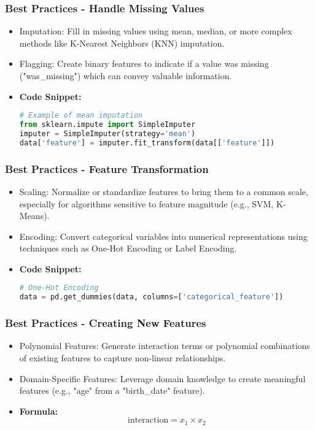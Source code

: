 \documentclass[aspectratio=169]{beamer}
\begin{document}
\begin{frame}[fragile]
    \frametitle{Best Practices - Handle Missing Values}
    \begin{itemize}
        \item Imputation: Fill in missing values using mean, median, or more complex methods like K-Nearest Neighbors (KNN) imputation.
        \item Flagging: Create binary features to indicate if a value was missing ("was\_missing") which can convey valuable information.
        \item \textbf{Code Snippet:}
        \begin{lstlisting}[language=Python]
# Example of mean imputation
from sklearn.impute import SimpleImputer
imputer = SimpleImputer(strategy='mean')
data['feature'] = imputer.fit_transform(data[['feature']])
        \end{lstlisting}
    \end{itemize}
\end{frame}

\begin{frame}[fragile]
    \frametitle{Best Practices - Feature Transformation}
    \begin{itemize}
        \item Scaling: Normalize or standardize features to bring them to a common scale, especially for algorithms sensitive to feature magnitude (e.g., SVM, K-Means).
        \item Encoding: Convert categorical variables into numerical representations using techniques such as One-Hot Encoding or Label Encoding.
        \item \textbf{Code Snippet:}
        \begin{lstlisting}[language=Python]
# One-Hot Encoding
data = pd.get_dummies(data, columns=['categorical_feature'])
        \end{lstlisting}
    \end{itemize}
\end{frame}

\begin{frame}
    \frametitle{Best Practices - Creating New Features}
    \begin{itemize}
        \item Polynomial Features: Generate interaction terms or polynomial combinations of existing features to capture non-linear relationships.
        \item Domain-Specific Features: Leverage domain knowledge to create meaningful features (e.g., "age" from a "birth\_date" feature).
        \item \textbf{Formula:}
        \begin{equation}
            \text{interaction} = x_1 \times x_2
        \end{equation}
    \end{itemize}
\end{frame}
\end{document}
